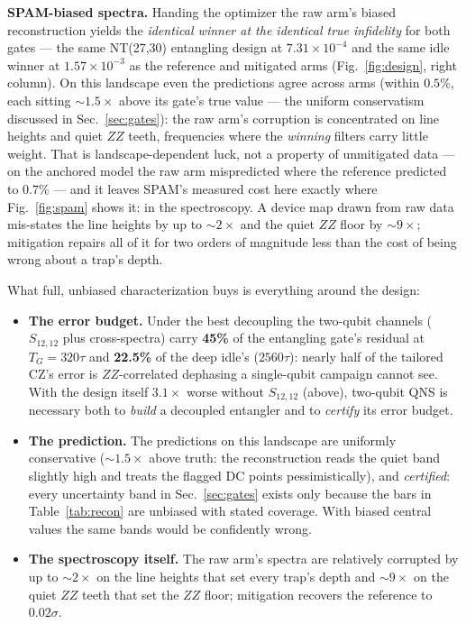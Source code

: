 \documentclass[10pt]{article}
\newcommand{\TG}{T_G}
\begin{document}
\textbf{SPAM-biased spectra.} Handing the optimizer the raw arm's biased
reconstruction yields the \emph{identical winner at the identical true
infidelity} for both gates --- the same NT(27,30) entangling design at
$7.31\times10^{-4}$ and the same idle winner at $1.57\times10^{-3}$ as the
reference and mitigated arms (Fig.~\ref{fig:design}, right column). On this
landscape even the predictions agree across arms (within $0.5\%$, each
sitting $\sim 1.5\times$ above its gate's true value --- the uniform
conservatism discussed in Sec.~\ref{sec:gates}): the raw arm's corruption
is concentrated on line heights and quiet $ZZ$ teeth, frequencies where the
\emph{winning} filters carry little weight. That is landscape-dependent
luck, not a property of unmitigated data --- on the anchored model the raw
arm mispredicted where the reference predicted to $0.7\%$ --- and it leaves
SPAM's measured cost here exactly where Fig.~\ref{fig:spam} shows it: in
the spectroscopy. A device map drawn from raw data mis-states the line
heights by up to $\sim 2\times$ and the quiet $ZZ$ floor by $\sim 9\times$;
mitigation repairs all of it for two orders of magnitude less than the
cost of being wrong about a trap's depth.

What full, unbiased characterization buys is everything around the design:

\begin{itemize}[leftmargin=1.4em, itemsep=0.1em, topsep=0.2em]
\item \textbf{The error budget.} Under the best decoupling the two-qubit
channels ($S_{12,12}$ plus cross-spectra) carry \textbf{45\%} of the
entangling gate's residual at $\TG = 320\tau$ and \textbf{22.5\%} of the
deep idle's ($2560\tau$): nearly half of the tailored CZ's error is
$ZZ$-correlated dephasing a single-qubit campaign cannot see. With the
design itself $3.1\times$ worse without $S_{12,12}$ (above), two-qubit QNS
is necessary both to \emph{build} a decoupled entangler and to
\emph{certify} its error budget.
\item \textbf{The prediction.} The predictions on this landscape are
uniformly conservative ($\sim 1.5\times$ above truth: the reconstruction
reads the quiet band slightly high and treats the flagged DC points
pessimistically), and \emph{certified}: every uncertainty band in
Sec.~\ref{sec:gates} exists only because the bars in Table~\ref{tab:recon}
are unbiased with stated coverage. With biased central values the same
bands would be confidently wrong.
\item \textbf{The spectroscopy itself.} The raw arm's spectra are
relatively corrupted by up to $\sim 2\times$ on the line heights that set
every trap's depth and $\sim 9\times$ on the quiet $ZZ$ teeth that set the
$ZZ$ floor; mitigation recovers the reference to $0.02\sigma$.
\end{itemize}
\end{document}
